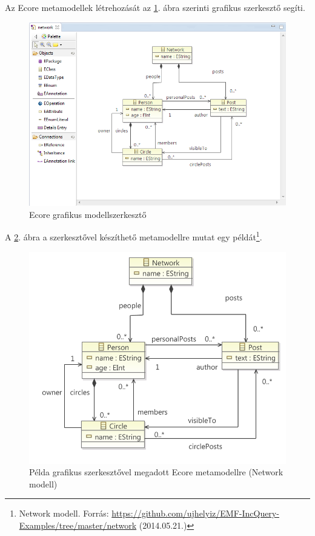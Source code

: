 Az Ecore metamodellek létrehozását az \ref{fig:EcoreDiagramEditor}. ábra szerinti grafikus szerkesztő segíti.
%
\begin{figure}[htb]
\centering
\includegraphics[width=\textwidth]{figures/ecore-diag-editor.png}
\caption{Ecore grafikus modellszerkesztő}
\label{fig:EcoreDiagramEditor}
\end{figure}
%
A \ref{fig:EcoreMetaModelExample}. ábra a szerkesztővel készíthető metamodellre mutat egy példát\footnote{Network modell. Forrás: \url{https://github.com/ujhelyiz/EMF-IncQuery-Examples/tree/master/network} (2014.05.21.)}.
%
\begin{figure}[htb]
\centering
\includegraphics[width=\textwidth]{figures/ecore-network-metamodel-diag.pdf}
\caption{Példa grafikus szerkesztővel megadott Ecore metamodellre (Network modell)}
\label{fig:EcoreMetaModelExample}
\end{figure}
